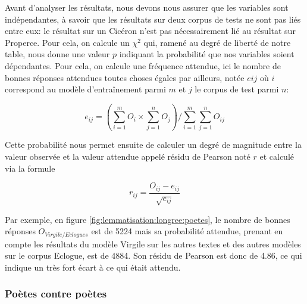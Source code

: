 Avant d'analyser les résultats, nous devons nous assurer que les variables sont indépendantes, à savoir que les résultats sur deux corpus de tests ne sont pas liés entre eux: le résultat sur un Cicéron n'est pas nécessairement lié au résultat sur Properce. Pour cela, on calcule un $\chi^{2}$ qui, ramené au degré de liberté de notre table, nous donne une valeur $p$ indiquant la probabilité que nos variables soient dépendantes. Pour cela, on calcule une fréquence attendue, ici le nombre de bonnes réponses attendues toutes choses égales par ailleurs, notée $e{ij}$ où $i$ correspond au modèle d'entraînement parmi $m$ et $j$ le corpus de test parmi $n$:

\begin{equation}
    e_{ij} = \left ( \sum_{i=1}^{m}O_{i} \times \sum_{j=1}^{n}O_{j}  \right ) / \sum_{i=1}^{m}\sum_{j=1}^{n}O_{ij}
\end{equation}

Cette probabilité nous permet ensuite de calculer un degré de magnitude entre la valeur observée et la valeur attendue appelé résidu de Pearson noté $r$ et calculé via la formule

\begin{equation}
    r_{ij} = \frac{O_{ij} - e_{ij}}{\sqrt{e_{ij}}}
\end{equation}

Par exemple, en figure \ref{fig:lemmatisation:longree:poetes}, le nombre de bonnes réponses $O_{Virgile/Eclogues}$ est de 5224 mais sa probabilité attendue, prenant en compte les résultats du modèle Virgile sur les autres textes et des autres modèles sur le corpus Eclogue, est de 4884. Son résidu de Pearson est donc de 4.86, ce qui indique un très fort écart à ce qui était attendu.

\subsubsection{Poètes contre poètes}

